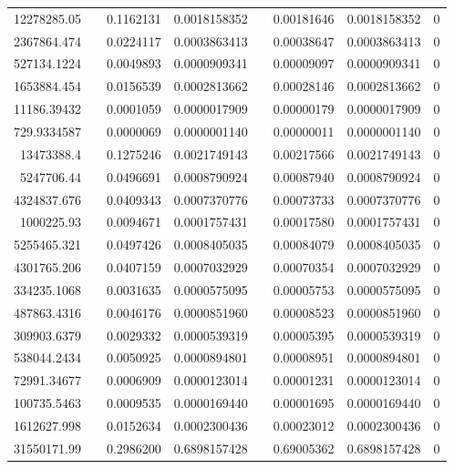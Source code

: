 \documentclass[
journal=jacsat, %
manuscript=article]{achemso}
\begin{document}
\begin{table}[htbp]
{\begin{tabular}{rrrrrrrr}
    12278285.05 &       & 0.1162131 & 0.0018158352 &       & 0.00181646 & 0.0018158352 & 0 \\
    2367864.474 &       & 0.0224117 & 0.0003863413 &       & 0.00038647 & 0.0003863413 & 0 \\
    527134.1224 &       & 0.0049893 & 0.0000909341 &       & 0.00009097 & 0.0000909341 & 0 \\
    1653884.454 &       & 0.0156539 & 0.0002813662 &       & 0.00028146 & 0.0002813662 & 0 \\
    11186.39432 &       & 0.0001059 & 0.0000017909 &       & 0.00000179 & 0.0000017909 & 0 \\
    729.9334587 &       & 0.0000069 & 0.0000001140 &       & 0.00000011 & 0.0000001140 & 0 \\
    13473388.4 &       & 0.1275246 & 0.0021749143 &       & 0.00217566 & 0.0021749143 & 0 \\
    5247706.44 &       & 0.0496691 & 0.0008790924 &       & 0.00087940 & 0.0008790924 & 0 \\
    4324837.676 &       & 0.0409343 & 0.0007370776 &       & 0.00073733 & 0.0007370776 & 0 \\
    1000225.93 &       & 0.0094671 & 0.0001757431 &       & 0.00017580 & 0.0001757431 & 0 \\
    5255465.321 &       & 0.0497426 & 0.0008405035 &       & 0.00084079 & 0.0008405035 & 0 \\
    4301765.206 &       & 0.0407159 & 0.0007032929 &       & 0.00070354 & 0.0007032929 & 0 \\
    334235.1068 &       & 0.0031635 & 0.0000575095 &       & 0.00005753 & 0.0000575095 & 0 \\
    487863.4316 &       & 0.0046176 & 0.0000851960 &       & 0.00008523 & 0.0000851960 & 0 \\
    309903.6379 &       & 0.0029332 & 0.0000539319 &       & 0.00005395 & 0.0000539319 & 0 \\
    538044.2434 &       & 0.0050925 & 0.0000894801 &       & 0.00008951 & 0.0000894801 & 0 \\
    72991.34677 &       & 0.0006909 & 0.0000123014 &       & 0.00001231 & 0.0000123014 & 0 \\
    100735.5463 &       & 0.0009535 & 0.0000169440 &       & 0.00001695 & 0.0000169440 & 0 \\
    1612627.998 &       & 0.0152634 & 0.0002300436 &       & 0.00023012 & 0.0002300436 & 0 \\
    31550171.99 &       & 0.2986200 & 0.6898157428 &       & 0.69005362 & 0.6898157428 & 0 \\

\end{tabular}}
\end{table}
\end{document}
